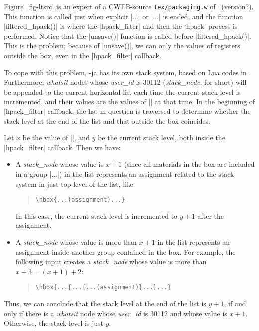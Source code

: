 \documentclass{ajt}
\begin{document}
Figure~\ref{fig-ltsrc} is an expert of a CWEB-source
\texttt{tex/packaging.w} of \LuaTeX\ (version?). This function is called
just when explicit |\hbox{...}| or |\vbox{...}| is ended, and the
function |filtered_hpack()| is where the |hpack_filter| and then the
`hpack' process is performed. Notice that the |unsave()| function is
called before |filtered_hpack()|. This is the problem; because of
|unsave()|, we can only the values of registers outside the box, even in
the |hpack_filter| callback.

To cope with this problem, \LuaTeX-ja has its own stack system, based on
Lua codes in \cite{stack-mail}. Furthermore, \emph{whatsit} nodes whose
\emph{user\_id} is 30112 (\emph{stack\_node}, for short) will be
appended to the current horizontal list each time the current stack
level is incremented, and their values are the values of
|\currentgrouplevel| at that time. In the beginning of |hpack_filter|
callback, the list in question is traversed to determine whether the
stack level at the end of the list and that outside the box coincides.

Let $x$ be the value of |\currentgrouplevel|, and $y$ be the current
stack level, both inside the |hpack_filter| callback. Then we have:
\begin{itemize}
\item A \emph{stack\_node} whose value is $x+1$ (since all materials in
      the box are included in a group |\hbox{...}|) in the list
      represents an assignment related to the stack system in just
      top-level of the list, like
\begin{quote}
\begin{verbatim}
\hbox{...(assignment)...}
\end{verbatim}
\end{quote}
In this case, the current stack level is incremented to $y+1$ after the assignment.
\item A \emph{stack\_node} whose value is more than  $x+1$ in the list represents
an assignment inside another group contained in the box. For example,
      the following input creates
a \emph{stack\_node} whose value is more than  $x+3=(x+1)+2$:
\begin{quote}
\begin{verbatim}
\hbox{...{...{...(assignment)}...}...}
\end{verbatim}
\end{quote}
\end{itemize}
Thus, we can conclude that the stack
level at the end of the list is $y+1$, if and only if there is a
\emph{whatsit} node whose \emph{user\_id} is 30112 and whose value is
$x+1$. Otherwise, the stack level is just $y$.
\end{document}

